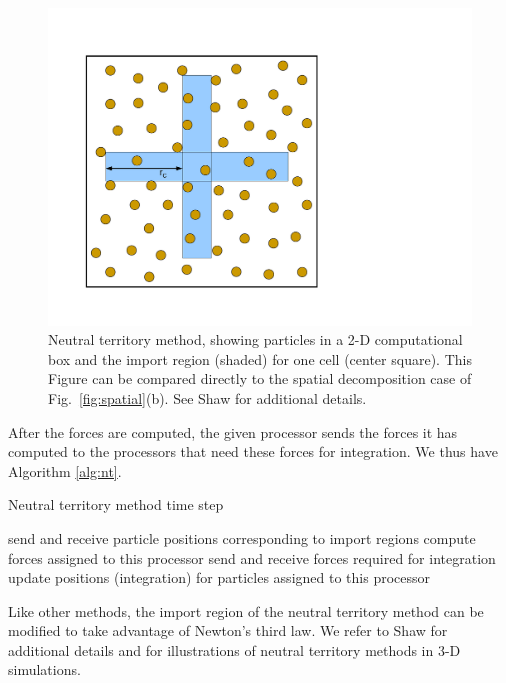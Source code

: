 \begin{figure}[htb]
\begin{center}
\includegraphics[clip=true,viewport=70 70 506 506,scale=.40]{mdchapter/fig-ntmethodpdf}
\caption{Neutral territory method, showing particles in a 2-D computational box
and the import region (shaded) for one cell (center square).  This Figure can
be compared directly to the spatial decomposition case of Fig.~\ref{fig:spatial}(b).
See Shaw \cite{shaw} for additional details.
}
\label{fig:nt}
\end{center}
\end{figure}

After the forces are computed, the given processor sends the forces
it has computed to the processors that need these forces for integration.
We thus have Algorithm \ref{alg:nt}.
\begin{algorithm}
\caption{Neutral territory method time step}
\label{alg:nt}
\begin{algorithmic}[1]
\STATE send and receive particle positions corresponding to import regions
\STATE compute forces assigned to this processor
\STATE send and receive forces required for integration
\STATE update positions (integration) for particles assigned to this processor
\end{algorithmic}
\end{algorithm}

Like other methods, the import region of the neutral territory method can 
be modified to take advantage of Newton's third law.  We refer to
Shaw \cite{shaw} for additional details and for illustrations of neutral
territory methods in 3-D simulations.

